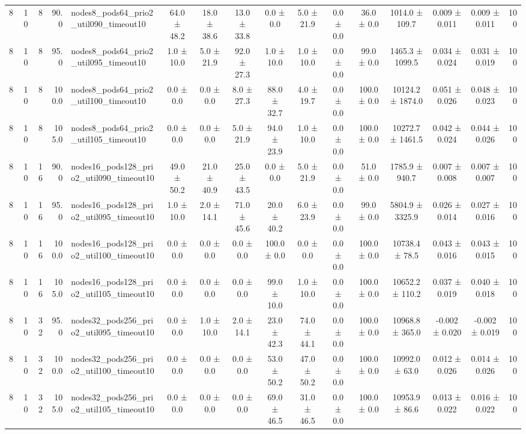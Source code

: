 \begin{tabular}{r r r r l c c c c c c c c c c r}
8 & 10 & 8 & 90.0 & nodes8\_pods64\_prio2\_util090\_timeout10 & 64.0 ± 48.2 & 18.0 ± 38.6 & 13.0 ± 33.8 & 0.0 ± 0.0 & 5.0 ± 21.9 & 0.0 ± 0.0 & 36.0 ± 0.0 & 1014.0 ± 109.7 & 0.009 ± 0.011 & 0.009 ± 0.011 & 100 \\
8 & 10 & 8 & 95.0 & nodes8\_pods64\_prio2\_util095\_timeout10 & 1.0 ± 10.0 & 5.0 ± 21.9 & 92.0 ± 27.3 & 1.0 ± 10.0 & 1.0 ± 10.0 & 0.0 ± 0.0 & 99.0 ± 0.0 & 1465.3 ± 1099.5 & 0.034 ± 0.024 & 0.031 ± 0.019 & 100 \\
8 & 10 & 8 & 100.0 & nodes8\_pods64\_prio2\_util100\_timeout10 & 0.0 ± 0.0 & 0.0 ± 0.0 & 8.0 ± 27.3 & 88.0 ± 32.7 & 4.0 ± 19.7 & 0.0 ± 0.0 & 100.0 ± 0.0 & 10124.2 ± 1874.0 & 0.051 ± 0.026 & 0.048 ± 0.023 & 100 \\
8 & 10 & 8 & 105.0 & nodes8\_pods64\_prio2\_util105\_timeout10 & 0.0 ± 0.0 & 0.0 ± 0.0 & 5.0 ± 21.9 & 94.0 ± 23.9 & 1.0 ± 10.0 & 0.0 ± 0.0 & 100.0 ± 0.0 & 10272.7 ± 1461.5 & 0.042 ± 0.024 & 0.044 ± 0.026 & 100 \\
8 & 10 & 16 & 90.0 & nodes16\_pods128\_prio2\_util090\_timeout10 & 49.0 ± 50.2 & 21.0 ± 40.9 & 25.0 ± 43.5 & 0.0 ± 0.0 & 5.0 ± 21.9 & 0.0 ± 0.0 & 51.0 ± 0.0 & 1785.9 ± 940.7 & 0.007 ± 0.008 & 0.007 ± 0.007 & 100 \\
8 & 10 & 16 & 95.0 & nodes16\_pods128\_prio2\_util095\_timeout10 & 1.0 ± 10.0 & 2.0 ± 14.1 & 71.0 ± 45.6 & 20.0 ± 40.2 & 6.0 ± 23.9 & 0.0 ± 0.0 & 99.0 ± 0.0 & 5804.9 ± 3325.9 & 0.026 ± 0.014 & 0.027 ± 0.016 & 100 \\
8 & 10 & 16 & 100.0 & nodes16\_pods128\_prio2\_util100\_timeout10 & 0.0 ± 0.0 & 0.0 ± 0.0 & 0.0 ± 0.0 & 100.0 ± 0.0 & 0.0 ± 0.0 & 0.0 ± 0.0 & 100.0 ± 0.0 & 10738.4 ± 78.5 & 0.043 ± 0.016 & 0.043 ± 0.015 & 100 \\
8 & 10 & 16 & 105.0 & nodes16\_pods128\_prio2\_util105\_timeout10 & 0.0 ± 0.0 & 0.0 ± 0.0 & 0.0 ± 0.0 & 99.0 ± 10.0 & 1.0 ± 10.0 & 0.0 ± 0.0 & 100.0 ± 0.0 & 10652.2 ± 110.2 & 0.037 ± 0.019 & 0.040 ± 0.018 & 100 \\
8 & 10 & 32 & 95.0 & nodes32\_pods256\_prio2\_util095\_timeout10 & 0.0 ± 0.0 & 1.0 ± 10.0 & 2.0 ± 14.1 & 23.0 ± 42.3 & 74.0 ± 44.1 & 0.0 ± 0.0 & 100.0 ± 0.0 & 10968.8 ± 365.0 & -0.002 ± 0.020 & -0.002 ± 0.019 & 100 \\
8 & 10 & 32 & 100.0 & nodes32\_pods256\_prio2\_util100\_timeout10 & 0.0 ± 0.0 & 0.0 ± 0.0 & 0.0 ± 0.0 & 53.0 ± 50.2 & 47.0 ± 50.2 & 0.0 ± 0.0 & 100.0 ± 0.0 & 10992.0 ± 63.0 & 0.012 ± 0.026 & 0.014 ± 0.026 & 100 \\
8 & 10 & 32 & 105.0 & nodes32\_pods256\_prio2\_util105\_timeout10 & 0.0 ± 0.0 & 0.0 ± 0.0 & 0.0 ± 0.0 & 69.0 ± 46.5 & 31.0 ± 46.5 & 0.0 ± 0.0 & 100.0 ± 0.0 & 10953.9 ± 86.6 & 0.013 ± 0.022 & 0.016 ± 0.022 & 100 \\

\end{tabular}
